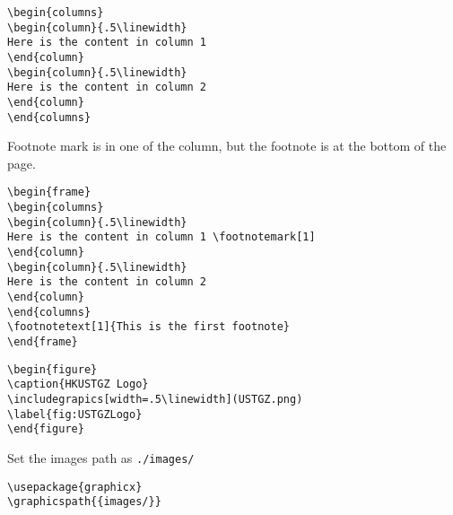 \documentclass[8pt]{innovativeinnovation-cheatsheet}
\begin{document}
\begin{multicols*}{3}


\begin{lstlisting}
\begin{columns}
\begin{column}{.5\linewidth}
Here is the content in column 1
\end{column}
\begin{column}{.5\linewidth}
Here is the content in column 2
\end{column}
\end{columns}
\end{lstlisting}


Footnote mark is in one of the column, but the footnote is at the bottom of the page.

\begin{lstlisting}
\begin{frame}
\begin{columns}
\begin{column}{.5\linewidth}
Here is the content in column 1 \footnotemark[1]
\end{column}
\begin{column}{.5\linewidth}
Here is the content in column 2
\end{column}
\end{columns}
\footnotetext[1]{This is the first footnote}
\end{frame}
\end{lstlisting}




\begin{lstlisting}
\begin{figure}
\caption{HKUSTGZ Logo}
\includegrapics[width=.5\linewidth](USTGZ.png)
\label{fig:USTGZLogo}
\end{figure}
\end{lstlisting}


Set the images path as \verb|./images/|

\begin{lstlisting}
\usepackage{graphicx}
\graphicspath{{images/}}
\end{lstlisting}

\columnbreak


\end{multicols*}
\end{document}

